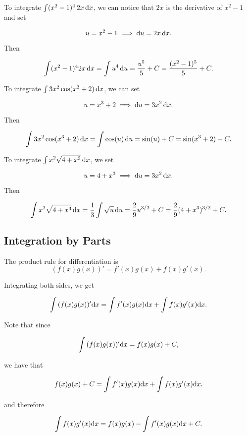 \documentclass{article}
\begin{document}
  {
    \everymath{\displaystyle}
  \begin{eg}
  To integrate \(\int(x^2-1)^4 \, 2x \, \mathrm{d} x\), we can notice that \(2x\) is the derivative of \(x^2-1\) and set 

  \[
    u = x^2-1 \implies \mathrm{d} u = 2x \, \mathrm{d} x.
  \]

  Then 

  \[
    \int(x^2-1)^42x \, \mathrm{d} x = \int u^4 \, \mathrm{d} u = \frac{u^5}{5} + C = \frac{(x^2-1)^5}{5} + C.
  \]
  \end{eg}

  \begin{eg}
    To integrate \(\int 3x^2 \cos(x^3+2) \, \mathrm{d} x\), we can set 

    \[
      u = x^3+2 \implies \mathrm{d} u = 3x^2 \, \mathrm{d} x.
    \]

    Then 

    \[
      \int 3x^2 \cos(x^3+2) \, \mathrm{d} x = \int \cos(u) \, \mathrm{d} u = \sin(u) + C = \sin(x^3+2) + C.
    \]
  \end{eg}

  \begin{eg}
    To integrate \(\int x^2 \sqrt{4+x^3} \, \mathrm{d} x\), we set 

    \[
      u = 4+x^3 \implies \mathrm{d} u = 3x^2 \, \mathrm{d} x.
    \]

    Then 

    \[
      \int x^2 \sqrt{4+x^3} \, \mathrm{d} x = \frac{1}{3}\int \sqrt{u} \, \mathrm{d} u = \frac{2}{9}u^{3/2} + C = \frac{2}{9}(4+x^3)^{3/2} + C.
    \]
  \end{eg}
  }

  \subsection{Integration by Parts}

  The product rule for differentiation is
  \[
    (f(x)g(x))' = f'(x)g(x) + f(x)g'(x).
  \]

  Integrating both sides, we get 

  \[
    \int{(f(x)g(x))' \mathrm{d}x} = \int{f'(x)g(x) \mathrm{d}x} + \int{f(x)g'(x) \mathrm{d}x}.
  \]

  Note that since

  \[
    \int{(f(x)g(x))' \mathrm{d}x} = f(x)g(x) + C,
  \]

  we have that 

  \[
    f(x)g(x)+ C = \int{f'(x)g(x) \mathrm{d}x} + \int{f(x)g'(x) \mathrm{d}x}.
  \]

  and therefore 

  \[
    \int{f(x)g'(x) \mathrm{d}x} = f(x)g(x) - \int{f'(x)g(x) \mathrm{d}x} + C.
  \]
\end{document}
